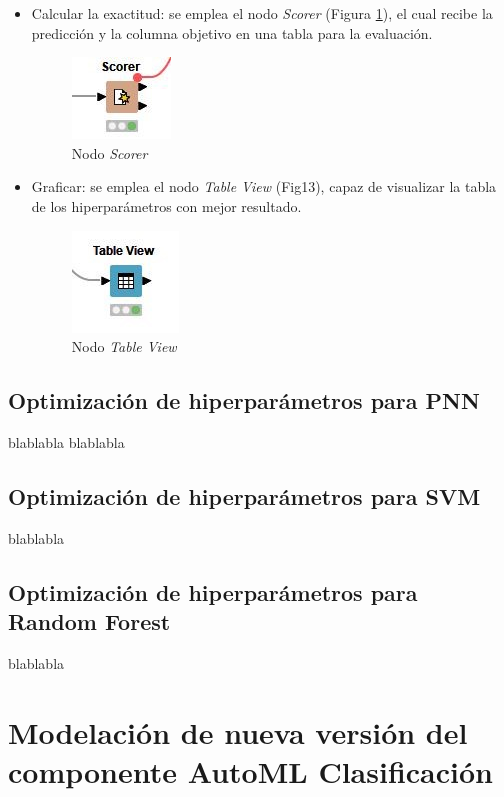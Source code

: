 \begin{itemize}
	\item Calcular la exactitud: se emplea el nodo \textit{Scorer} (Figura \ref{fig:nodo-scorer}), el cual recibe la predicción y la columna objetivo en una tabla para la evaluación. 
	\begin{figure}[H]
		\centering
		\includegraphics[width=0.15\linewidth]{"figuras/capi 2/nodo-scorer"}
		\caption[Nodo Scorer]{Nodo \textit{Scorer}}
		\label{fig:nodo-scorer}
	\end{figure}
	
	\item Graficar: se emplea el nodo \textit{Table View} (Fig13), capaz de visualizar la tabla de los hiperparámetros con mejor resultado.
	\begin{figure}[H]
		\centering
		\includegraphics[width=0.15\linewidth]{"figuras/capi 2/nodo-table-view"}
		\caption[Nodo Table View]{Nodo \textit{Table View}}
		\label{fig:nodo-table-view}
	\end{figure}
	
\end{itemize}


\subsection{Optimización de hiperparámetros para PNN}
blablabla
blablabla

\subsection{Optimización de hiperparámetros para SVM}

blablabla

\subsection{Optimización de hiperparámetros para Random Forest}
blablabla






\section{Modelación de nueva versión del componente AutoML Clasificación}

